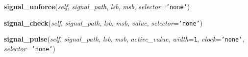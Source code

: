     \vspace{0.5ex}

\hspace{.8\funcindent}\begin{boxedminipage}{\funcwidth}

    \raggedright \textbf{signal\_unforce}(\textit{self}, \textit{signal\_path}, \textit{lsb}, \textit{msb}, \textit{selector}={\tt \texttt{'}\texttt{none}\texttt{'}})

\setlength{\parskip}{2ex}
\setlength{\parskip}{1ex}
    \end{boxedminipage}

    \label{htd_player_ui:htd_player_ui:signal_check}

    \vspace{0.5ex}

\hspace{.8\funcindent}\begin{boxedminipage}{\funcwidth}

    \raggedright \textbf{signal\_check}(\textit{self}, \textit{signal\_path}, \textit{lsb}, \textit{msb}, \textit{value}, \textit{selector}={\tt \texttt{'}\texttt{none}\texttt{'}})

\setlength{\parskip}{2ex}
\setlength{\parskip}{1ex}
    \end{boxedminipage}

    \label{htd_player_ui:htd_player_ui:signal_pulse}

    \vspace{0.5ex}

\hspace{.8\funcindent}\begin{boxedminipage}{\funcwidth}

    \raggedright \textbf{signal\_pulse}(\textit{self}, \textit{signal\_path}, \textit{lsb}, \textit{msb}, \textit{active\_value}, \textit{width}={\tt 1}, \textit{clock}={\tt \texttt{'}\texttt{none}\texttt{'}}, \textit{selector}={\tt \texttt{'}\texttt{none}\texttt{'}})

\setlength{\parskip}{2ex}
\setlength{\parskip}{1ex}
    \end{boxedminipage}

    \label{htd_player_ui:htd_player_ui:signal_wait}

